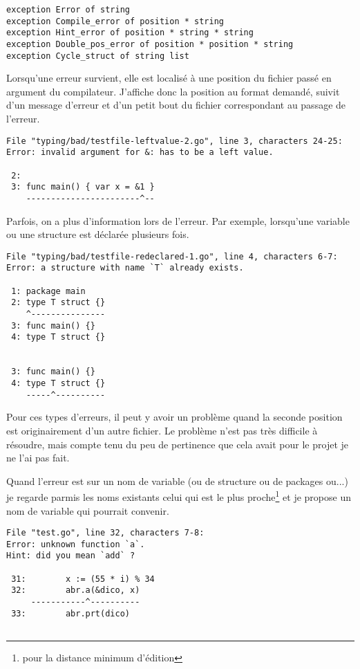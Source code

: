 \documentclass{article}
\begin{document}
\begin{verbatim}
exception Error of string
exception Compile_error of position * string
exception Hint_error of position * string * string
exception Double_pos_error of position * position * string
exception Cycle_struct of string list
\end{verbatim}

Lorsqu'une erreur survient, elle est localisé à une position du fichier passé en argument du compilateur. J'affiche donc la position au format demandé, suivit d'un message d'erreur et d'un petit bout du fichier correspondant au passage de l'erreur.

\begin{verbatim}
File "typing/bad/testfile-leftvalue-2.go", line 3, characters 24-25:
Error: invalid argument for &: has to be a left value.

 2:
 3: func main() { var x = &1 }
    -----------------------^--
\end{verbatim}

Parfois, on a plus d'information lors de l'erreur. Par exemple, lorsqu'une variable ou une structure est déclarée plusieurs fois.

\begin{verbatim}
File "typing/bad/testfile-redeclared-1.go", line 4, characters 6-7:
Error: a structure with name `T` already exists.

 1: package main
 2: type T struct {}
    ^---------------
 3: func main() {}
 4: type T struct {}


 3: func main() {}
 4: type T struct {}
    -----^----------
\end{verbatim}

Pour ces types d'erreurs, il peut y avoir un problème quand la seconde position est originairement d'un autre fichier. Le problème n'est pas très difficile à résoudre, mais compte tenu du peu de pertinence que cela avait pour le projet je ne l'ai pas fait.

Quand l'erreur est sur un nom de variable (ou de structure ou de packages ou...) je regarde parmis les noms existants celui qui est le plus proche\footnote{pour la distance minimum d'édition} et je propose un nom de variable qui pourrait convenir.

\begin{verbatim}
File "test.go", line 32, characters 7-8:
Error: unknown function `a`.
Hint: did you mean `add` ?

 31:        x := (55 * i) % 34
 32:        abr.a(&dico, x)
     -----------^----------
 33:        abr.prt(dico)


\end{verbatim}
\end{document}
